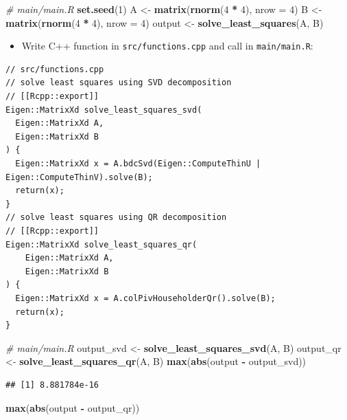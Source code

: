 \documentclass[]{book}
\newenvironment{Shaded}{\begin{snugshade}}{\end{snugshade}}
\newcommand{\KeywordTok}[1]{\textcolor[rgb]{0.13,0.29,0.53}{\textbf{#1}}}
\newcommand{\DataTypeTok}[1]{\textcolor[rgb]{0.13,0.29,0.53}{#1}}
\newcommand{\DecValTok}[1]{\textcolor[rgb]{0.00,0.00,0.81}{#1}}
\newcommand{\StringTok}[1]{\textcolor[rgb]{0.31,0.60,0.02}{#1}}
\newcommand{\CommentTok}[1]{\textcolor[rgb]{0.56,0.35,0.01}{\textit{#1}}}
\newcommand{\OperatorTok}[1]{\textcolor[rgb]{0.81,0.36,0.00}{\textbf{#1}}}
\newcommand{\NormalTok}[1]{#1}
\providecommand{\tightlist}{%
  \setlength{\itemsep}{0pt}\setlength{\parskip}{0pt}}
\begin{document}
\begin{Shaded}
\begin{Highlighting}[]
\CommentTok{# main/main.R}
\KeywordTok{set.seed}\NormalTok{(}\DecValTok{1}\NormalTok{)}
\NormalTok{A <-}\StringTok{ }\KeywordTok{matrix}\NormalTok{(}\KeywordTok{rnorm}\NormalTok{(}\DecValTok{4} \OperatorTok{*}\StringTok{ }\DecValTok{4}\NormalTok{), }\DataTypeTok{nrow =} \DecValTok{4}\NormalTok{)}
\NormalTok{B <-}\StringTok{ }\KeywordTok{matrix}\NormalTok{(}\KeywordTok{rnorm}\NormalTok{(}\DecValTok{4} \OperatorTok{*}\StringTok{ }\DecValTok{4}\NormalTok{), }\DataTypeTok{nrow =} \DecValTok{4}\NormalTok{)}
\NormalTok{output <-}\StringTok{ }\KeywordTok{solve_least_squares}\NormalTok{(A, B)}
\end{Highlighting}
\end{Shaded}

\begin{itemize}
\tightlist
\item
  Write C++ function in \texttt{src/functions.cpp} and call in
  \texttt{main/main.R}:
\end{itemize}

\begin{verbatim}
// src/functions.cpp
// solve least squares using SVD decomposition
// [[Rcpp::export]]
Eigen::MatrixXd solve_least_squares_svd(
  Eigen::MatrixXd A,
  Eigen::MatrixXd B
) {
  Eigen::MatrixXd x = A.bdcSvd(Eigen::ComputeThinU | Eigen::ComputeThinV).solve(B);
  return(x);
}
// solve least squares using QR decomposition
// [[Rcpp::export]]
Eigen::MatrixXd solve_least_squares_qr(
    Eigen::MatrixXd A,
    Eigen::MatrixXd B
) {
  Eigen::MatrixXd x = A.colPivHouseholderQr().solve(B);
  return(x);
}
\end{verbatim}

\begin{Shaded}
\begin{Highlighting}[]
\CommentTok{# main/main.R}
\NormalTok{output_svd <-}\StringTok{ }\KeywordTok{solve_least_squares_svd}\NormalTok{(A, B)}
\NormalTok{output_qr <-}\StringTok{ }\KeywordTok{solve_least_squares_qr}\NormalTok{(A, B)}
\KeywordTok{max}\NormalTok{(}\KeywordTok{abs}\NormalTok{(output }\OperatorTok{-}\StringTok{ }\NormalTok{output_svd))}
\end{Highlighting}
\end{Shaded}

\begin{verbatim}
## [1] 8.881784e-16
\end{verbatim}

\begin{Shaded}
\begin{Highlighting}[]
\KeywordTok{max}\NormalTok{(}\KeywordTok{abs}\NormalTok{(output }\OperatorTok{-}\StringTok{ }\NormalTok{output_qr))}
\end{Highlighting}
\end{Shaded}
\end{document}
